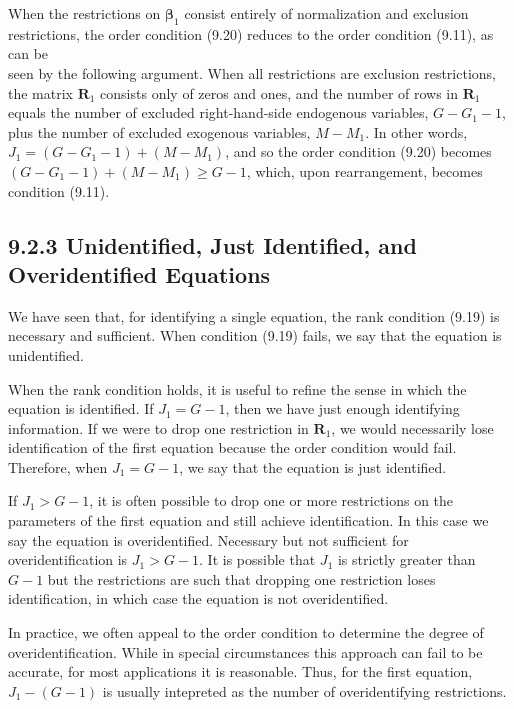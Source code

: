 \documentclass[10pt]{article}
\begin{document}
When the restrictions on $\boldsymbol{\beta}_{1}$ consist entirely of normalization and exclusion restrictions, the order condition (9.20) reduces to the order condition (9.11), as can be\\
seen by the following argument. When all restrictions are exclusion restrictions, the matrix $\mathbf{R}_{1}$ consists only of zeros and ones, and the number of rows in $\mathbf{R}_{1}$ equals the number of excluded right-hand-side endogenous variables, $G-G_{1}-1$, plus the number of excluded exogenous variables, $M-M_{1}$. In other words, $J_{1}=\left(G-G_{1}-1\right)+ \left(M-M_{1}\right)$, and so the order condition (9.20) becomes $\left(G-G_{1}-1\right)+\left(M-M_{1}\right) \geq G-1$, which, upon rearrangement, becomes condition (9.11).

\subsection*{9.2.3 Unidentified, Just Identified, and Overidentified Equations}
We have seen that, for identifying a single equation, the rank condition (9.19) is necessary and sufficient. When condition (9.19) fails, we say that the equation is unidentified.

When the rank condition holds, it is useful to refine the sense in which the equation is identified. If $J_{1}=G-1$, then we have just enough identifying information. If we were to drop one restriction in $\mathbf{R}_{1}$, we would necessarily lose identification of the first equation because the order condition would fail. Therefore, when $J_{1}=G-1$, we say that the equation is just identified.

If $J_{1}>G-1$, it is often possible to drop one or more restrictions on the parameters of the first equation and still achieve identification. In this case we say the equation is overidentified. Necessary but not sufficient for overidentification is $J_{1}>G-1$. It is possible that $J_{1}$ is strictly greater than $G-1$ but the restrictions are such that dropping one restriction loses identification, in which case the equation is not overidentified.

In practice, we often appeal to the order condition to determine the degree of overidentification. While in special circumstances this approach can fail to be accurate, for most applications it is reasonable. Thus, for the first equation, $J_{1}-(G-1)$ is usually intepreted as the number of overidentifying restrictions.
\end{document}
